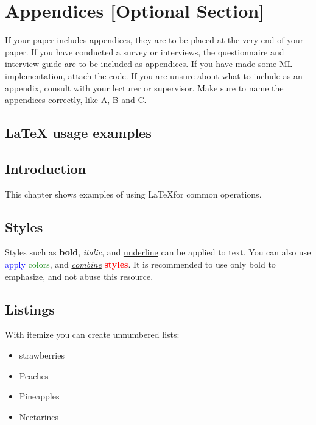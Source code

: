 \section{Appendices [Optional Section]}
\label{chap:appendices}

If your paper includes appendices, they are to be placed at the very end of your paper. If you have conducted a survey or interviews, the questionnaire and interview guide are to be included as appendices. If you have made some ML implementation, attach the code. If you are unsure about what to include as an appendix, consult with your lecturer or supervisor. Make sure to name the appendices correctly, like A, B and C.

\subsection{LaTeX usage examples}


\subsection{Introduction}
This chapter shows examples of using \LaTeX for common operations.

\subsection{Styles}
\label{sec:styles}
Styles such as \textbf{bold}, \textit{italic}, and \underline{underline} can be applied to text. You can also use \textcolor{red}{} \textcolor{blue}{apply} \textcolor{green}{colors}, and \underline{\textit{combine}} \textbf{\textcolor{red}{styles}}. It is recommended to use only bold to emphasize, and not abuse this resource.

\subsection{Listings}
With itemize you can create unnumbered lists:

\begin{itemize}
  \item strawberries
  \item Peaches
  \item Pineapples
  \item Nectarines
\end{itemize}

